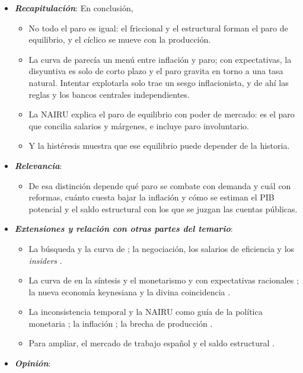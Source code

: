 \documentclass[11pt]{article}
\begin{document}
\begin{itemize}
\item \textbf{\emph{Recapitulación}}: En conclusión,
  \begin{itemize}
  \item No todo el paro es igual: el friccional y el estructural forman el paro de equilibrio, y el cíclico se mueve con la producción.
  \item La curva de  parecía un menú entre inflación y paro; con expectativas, la disyuntiva es solo de corto plazo y el paro gravita en torno a una tasa natural. Intentar explotarla solo trae un sesgo inflacionista, y de ahí las reglas y los bancos centrales independientes.
  \item La NAIRU explica el paro de equilibrio con poder de mercado: es el paro que concilia salarios y márgenes, e incluye paro involuntario.
  \item Y la histéresis muestra que ese equilibrio puede depender de la historia.
  \end{itemize}
\item \textbf{\emph{Relevancia}}:
  \begin{itemize}
  \item De esa distinción depende qué paro se combate con demanda y cuál con reformas, cuánto cuesta bajar la inflación y cómo se estiman el PIB potencial y el saldo estructural con los que se juzgan las cuentas públicas.
  \end{itemize}
\item \textbf{\emph{Extensiones y relación con otras partes del temario}}:
  \begin{itemize}
  \item La búsqueda y la curva de  ; la negociación, los salarios de eficiencia y los \emph{insiders} .
  \item La curva de  en la síntesis y el monetarismo  y con expectativas racionales ; la nueva economía keynesiana y la divina coincidencia .
  \item La inconsistencia temporal y la NAIRU como guía de la política monetaria ; la inflación ; la brecha de producción .
  \item Para ampliar, el mercado de trabajo español  y el saldo estructural .
  \end{itemize}
\item \textbf{\emph{Opinión}}:

\end{itemize}
\end{document}
